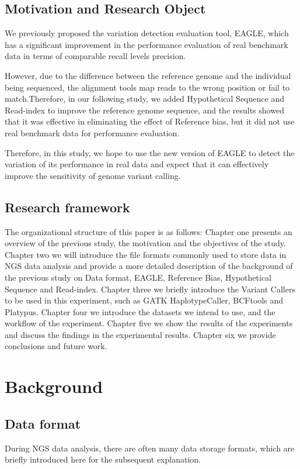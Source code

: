 \documentclass[PhD]{PHlab-thesis}
\begin{document}
\section{Motivation and Research Object}
We previously proposed the variation detection evaluation tool, EAGLE, which has a significant improvement in the performance evaluation of real benchmark data in terms of comparable recall levels precision.

However, due to the difference between the reference genome and the individual being sequenced, the alignment tools map reads to the wrong position or fail to match.Therefore, in our following study, we added Hypothetical Sequence and Read-index to improve the reference genome sequence, and the results showed that it was effective in eliminating the effect of Reference bias, but it did not use real benchmark data for performance evaluation.

Therefore, in this study, we hope to use the new version of EAGLE to detect the variation of its performance in real data and expect that it can effectively improve the sensitivity of genome variant calling.
\section{Research framework}
The organizational structure of this paper is as follows: Chapter one presents an overview of the previous study, the motivation and the objectives of the study. Chapter two we will introduce the file formats commonly used to store data in NGS data analysis and provide a more detailed description of the background of the previous study on Data format, EAGLE, Reference Bias, Hypothetical Sequence and Read-index. Chapter three we briefly introduce the Variant Callers to be used in this experiment, such as GATK HaplotypeCaller, BCFtools and Platypus. Chapter four we introduce the datasets we intend to use, and the workflow of the experiment. Chapter five we show the results of the experiments and discuss the findings in the experimental results. Chapter six we provide conclusions and future work.

\chapter{Background}
\section{Data format}
During NGS data analysis, there are often many data storage formats, which are briefly introduced here for the subsequent explanation.
\end{document}
